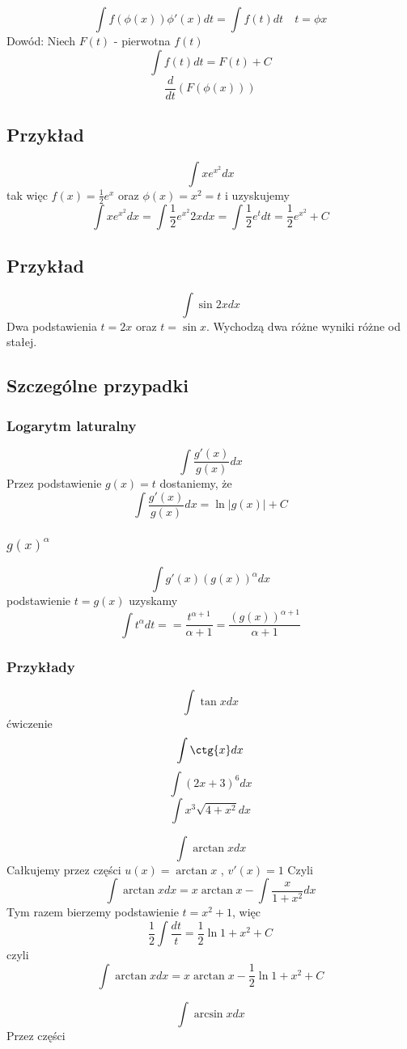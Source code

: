 $$\int f(\phi(x))\phi'(x)dt = \int f(t)dt \quad t = \phi{x}$$
\newpage
Dowód:
Niech $F(t)$ - pierwotna $f(t)$
$$\int f(t)dt = F(t) + C$$
$$\frac{d}{dt}\left( F(\phi(x)) \right)$$

\subsection{Przykład}
$$\int x e^{x^2} dx$$
tak więc $f(x) = \frac{1}{2}e^x$ oraz $\phi(x) = x^2 = t$ i uzyskujemy
$$\int x e^{x^2} dx = \int \frac{1}{2}e^{x^2}2xdx = \int \frac{1}{2}e^t dt = \frac{1}{2}e^{x^2} + C$$ 

\subsection{Przykład}
$$\int \sin{2x}dx $$
Dwa podstawienia $ t = 2x$ oraz $ t = \sin{x}$.
Wychodzą dwa różne wyniki różne od stałej.

\subsection{Szczególne przypadki}
\subsubsection{Logarytm laturalny}
$$\int \frac{g'(x)}{g(x)}dx$$
Przez podstawienie $ g(x) = t $ dostaniemy, że
$$\int \frac{g'(x)}{g(x)}dx = \ln{|g(x)|} + C$$
\subsubsection{$g(x)^{\alpha}$}
$$\int g'(x)(g(x))^{\alpha}dx$$
podstawienie $ t = g(x) $ uzyskamy
$$ \int t^\alpha dt == \frac{t^{\alpha+1}}{\alpha +1} = \frac{(g(x))^{\alpha+1}}{\alpha+1}$$

\subsubsection{Przykłady}
$$\int \tan{x} dx$$
ćwiczenie 
$$\int \ctg{x} dx$$
$$\int (2x+3)^6 dx$$
$$\int x^3\sqrt{4+x^2}dx$$

$$\int \arctan{x}dx$$
Całkujemy przez części $u(x) = \arctan{x}$ , $v'(x) = 1$
Czyli
$$\int \arctan{x}dx = x\arctan{x} - \int \frac{x}{1+x^2}dx$$
Tym razem bierzemy podstawienie $t = x^2 + 1$, więc 
$$\frac{1}{2}\int \frac{dt}{t} = \frac{1}{2}\ln{1+x^2} + C$$ czyli 
$$\int \arctan{x}dx = x \arctan{x} - \frac{1}{2}\ln{1+x^2} + C$$

$$\int \arcsin{x}dx$$
Przez części



